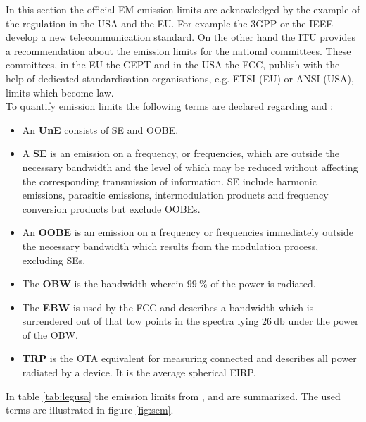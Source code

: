 In this section the official \ac{EM} emission limits are acknowledged by the example of the regulation in the \ac{USA} and the \ac{EU}. For example the \ac{3GPP} or the \ac{IEEE} develop a new telecommunication standard. On the other hand the \ac{ITU} provides a recommendation about the emission limits for the national committees. These committees, in the \ac{EU} the \ac{CEPT} and in the \ac{USA} the \ac{FCC}, publish with the help of dedicated standardisation organisations, e.g. \ac{ETSI} (\ac{EU}) or \ac{ANSI} (\ac{USA}), limits which become law.\\
To quantify emission limits the following terms are declared regarding \cite{seitur} and \cite{ctiaat}:

\begin{itemize}
\item An \textbf{\acf{UnE}} consists of \ac{SE} and \ac{OOBE}.
\item A \textbf{\acf{SE}} is an emission on a frequency, or frequencies, which are outside the necessary bandwidth and the level of which may be reduced without affecting the corresponding transmission of information. \acl{SE} include harmonic
emissions, parasitic emissions, intermodulation products and frequency conversion products but exclude \aclp{OOBE}.
\item An \textbf{\acf{OOBE}} is an emission on a frequency or frequencies immediately outside the necessary bandwidth which results from the modulation process, excluding \aclp{SE}.
\item The \textbf{\acf{OBW}} is the bandwidth wherein $\SI{99}{\percent}$ of the power is radiated.
\item The \textbf{\acf{EBW}} is used by the \ac{FCC} and describes a bandwidth which is surrendered out of that tow points in the spectra lying $\SI{26}{\decibel}$ under the power of the \ac{OBW}. 
\item \textbf{\acf{TRP}} is the \ac{OTA} equivalent for measuring connected and describes all power radiated by a device. It is the average spherical \ac{EIRP}.
\end{itemize}


In table \ref{tab:legusa} the emission limits from \cite{ceptercrec}, \cite{ansi} and \cite{fcc} are summarized. The used terms are illustrated in figure \ref{fig:sem}.

